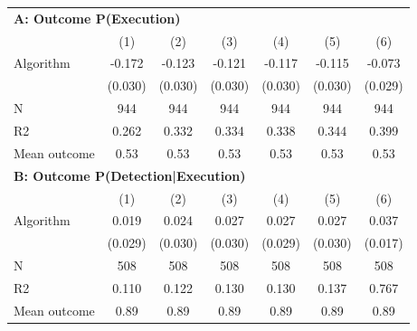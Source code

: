 \begin{tabular}{lcccccc} \toprule
\multicolumn{7}{l}{\textbf{A: Outcome P(Execution)}} \\ \multicolumn{1}{l}{} & (1) & (2) & (3) & (4) & (5) & (6) \\ \midrule
Algorithm   &      -0.172\sym{***}&      -0.123\sym{***}&      -0.121\sym{***}&      -0.117\sym{***}&      -0.115\sym{***}&      -0.073\sym{**} \\
            &     (0.030)         &     (0.030)         &     (0.030)         &     (0.030)         &     (0.030)         &     (0.029)         \\
\midrule
N           &         944         &         944         &         944         &         944         &         944         &         944         \\
R2          &       0.262         &       0.332         &       0.334         &       0.338         &       0.344         &       0.399         \\
Mean outcome&        0.53         &        0.53         &        0.53         &        0.53         &        0.53         &        0.53         \\

\midrule \multicolumn{7}{l}{\textbf{B: Outcome P(Detection|Execution)}} \\ \multicolumn{1}{l}{} & (1) & (2) & (3) & (4) & (5) & (6) \\ \midrule
Algorithm   &       0.019         &       0.024         &       0.027         &       0.027         &       0.027         &       0.037\sym{**} \\
            &     (0.029)         &     (0.030)         &     (0.030)         &     (0.029)         &     (0.030)         &     (0.017)         \\
\midrule
N           &         508         &         508         &         508         &         508         &         508         &         508         \\
R2          &       0.110         &       0.122         &       0.130         &       0.130         &       0.137         &       0.767         \\
Mean outcome&        0.89         &        0.89         &        0.89         &        0.89         &        0.89         &        0.89         \\


\end{tabular}
